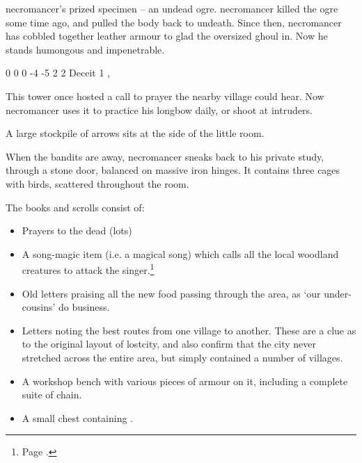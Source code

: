 \begin{multicols}{2}

\Gls{necromancer}'s prized specimen -- an undead ogre.
\Gls{necromancer} killed the ogre some time ago, and pulled the body back to undeath.
Since then, \gls{necromancer} has cobbled together leather armour to glad the oversized ghoul in.
Now he stands humongous and impenetrable.


{0}%
{0}%
{{0}%
{-4}%
{-5}}%
{2}%
{2}%
{Deceit 1}%
{\greatclub, \completeleather}%
{}%



This tower once hosted a call to prayer the nearby village could hear.
Now \gls{necromancer} uses it to practice his longbow daily, or shoot at intruders.

A large stockpile of arrows sits at the side of the little room.

\thenecromancer


When the bandits are away, \gls{necromancer} sneaks back to his private study, through a stone door, balanced on massive iron hinges.
It contains three cages with birds, scattered throughout the room.

The books and scrolls consist of:

\begin{itemize}

  \item
  Prayers to the dead (lots)
  \item
  A song-magic item (i.e. a magical song) which calls all the local woodland creatures to attack the singer.\footnote{Page \pageref{medalofheroism}.}
  \item
  Old letters praising all the new food passing through the area, as `our under-cousins' do business.
  \item
  Letters noting the best routes from one village to another.
  These are a clue as to the original layout of \gls{lostcity}, and also confirm that the city never stretched across the entire area, but simply contained a number of villages.
  \item
  A workshop bench with various pieces of armour on it, including a complete suite of chain.
  \item
  A small chest containing \lootMedium.


\end{itemize}
\end{multicols}
